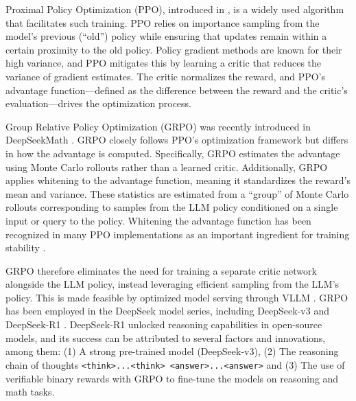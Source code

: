 \documentclass[11pt,reqno]{amsart}
\begin{document}
Proximal Policy Optimization (PPO), introduced in \citep{schulman2017proximal}, is a widely used algorithm that facilitates such training. PPO relies on importance sampling from the model’s previous (``old'') policy while ensuring that updates remain within a certain proximity to the old policy. Policy gradient methods are known for their high variance, and PPO mitigates this by learning a critic that reduces the variance of gradient estimates. The critic normalizes the reward, and PPO's advantage function—defined as the difference between the reward and the critic’s evaluation—drives the optimization process.

Group Relative Policy Optimization (GRPO) was recently introduced in DeepSeekMath \citep{shao2024deepseekmath}. GRPO closely follows PPO’s optimization framework but differs in how the advantage is computed. Specifically, GRPO estimates the advantage using Monte Carlo rollouts rather than a learned critic. Additionally, GRPO applies whitening to the advantage function, meaning it standardizes the reward’s mean and variance. These statistics are estimated from a ``group'' of Monte Carlo rollouts corresponding to  samples from the LLM policy conditioned on a single input or query to the policy. Whitening the advantage function has been recognized in many PPO implementations as an important ingredient for training stability \citep{Engstrom2020Implementation,huang2024the}. %

GRPO therefore eliminates the need for training a separate critic network alongside the LLM policy, instead leveraging efficient sampling from the LLM’s policy. This is made feasible by optimized model serving through VLLM \citep{kwon2023efficient}. GRPO has been employed in the DeepSeek model series, including DeepSeek-v3 \citep{liu2024deepseekv3} and DeepSeek-R1 \citep{guo2025deepseekR1}. DeepSeek-R1 unlocked reasoning capabilities in open-source models, and its success can be attributed to several factors and innovations, among them:  (1) A strong pre-trained model (DeepSeek-v3), (2) The reasoning chain of thoughts \texttt{<think>...<think> <answer>...<answer>}
and (3) The use of verifiable binary rewards with GRPO to fine-tune the models on reasoning and math tasks.
\end{document}
